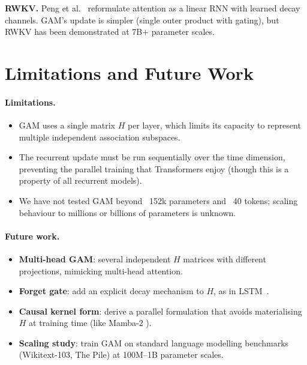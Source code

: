 \documentclass[11pt,a4paper]{article}
\begin{document}
\textbf{RWKV.}
Peng et al.~\cite{peng2023rwkv} reformulate attention as a linear
RNN with learned decay channels.  GAM's update is simpler (single
outer product with gating), but RWKV has been demonstrated at 7B+
parameter scales.

\section{Limitations and Future Work}
\label{sec:limit}

\paragraph{Limitations.}
\begin{itemize}[nosep]
  \item GAM uses a single matrix $H$ per layer, which limits its
    capacity to represent multiple independent association subspaces.
  \item The recurrent update must be run sequentially over the time
    dimension, preventing the parallel training that Transformers
    enjoy (though this is a property of all recurrent models).
  \item We have not tested GAM beyond ~152k parameters and ~40 tokens;
    scaling behaviour to millions or billions of parameters is unknown.
\end{itemize}

\paragraph{Future work.}
\begin{itemize}[nosep]
  \item \textbf{Multi-head GAM}: several independent $H$ matrices with
    different projections, mimicking multi-head attention.
  \item \textbf{Forget gate}: add an explicit decay mechanism to
    $H$, as in LSTM~\cite{hochreiter1997long}.
  \item \textbf{Causal kernel form}: derive a parallel formulation
    that avoids materialising $H$ at training time (like Mamba-2
    \cite{dao2024transformers}).
  \item \textbf{Scaling study}: train GAM on standard language
    modelling benchmarks (Wikitext-103, The Pile) at 100M--1B
    parameter scales.
\end{itemize}

\end{document}
